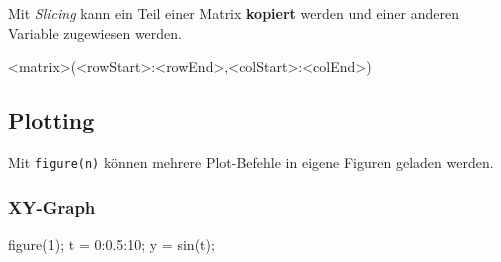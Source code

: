 \documentclass[
  10pt,
  a4paper,
  german]{article}
\newenvironment{Shaded}{}{}
\newcommand{\FloatTok}[1]{\textcolor[rgb]{0.00,0.36,0.77}{#1}}
\newcommand{\NormalTok}[1]{\textcolor[rgb]{0.14,0.16,0.18}{#1}}
\newcommand{\OperatorTok}[1]{\textcolor[rgb]{0.14,0.16,0.18}{#1}}
\newcommand{\VariableTok}[1]{\textcolor[rgb]{0.89,0.38,0.04}{#1}}
\numberwithin{equation}{section}
\begin{document}
\begin{multicols}{2}
\begin{tcolorbox}
Mit \emph{Slicing} kann ein Teil einer Matrix \textbf{kopiert} werden
und einer anderen Variable zugewiesen werden.

\begin{Shaded}
\begin{Highlighting}[]
\OperatorTok{\textless{}}\VariableTok{matrix}\OperatorTok{\textgreater{}}\NormalTok{(}\OperatorTok{\textless{}}\VariableTok{rowStart}\OperatorTok{\textgreater{}:\textless{}}\VariableTok{rowEnd}\OperatorTok{\textgreater{},\textless{}}\VariableTok{colStart}\OperatorTok{\textgreater{}:\textless{}}\VariableTok{colEnd}\OperatorTok{\textgreater{}}\NormalTok{)}
\end{Highlighting}
\end{Shaded}

\end{tcolorbox}

\hypertarget{plotting}{%
\subsection{Plotting}\label{plotting}}

\begin{tcolorbox}[enhanced jigsaw, rightrule=.15mm, toprule=.15mm, leftrule=.75mm, opacityback=0, title=\textcolor{quarto-callout-note-color}{\faInfo}\hspace{0.5em}{Figure-Separierung}, opacitybacktitle=0.6, colback=white, arc=.35mm, bottomrule=.15mm, colframe=quarto-callout-note-color-frame, coltitle=black, bottomtitle=1mm, left=2mm, toptitle=1mm, breakable, titlerule=0mm, colbacktitle=quarto-callout-note-color!10!white]

Mit \texttt{figure(n)} können mehrere Plot-Befehle in eigene Figuren
geladen werden.

\end{tcolorbox}

\hypertarget{xy-graph}{%
\subsubsection{XY-Graph}\label{xy-graph}}

\begin{Shaded}
\begin{Highlighting}[]
\VariableTok{figure}\NormalTok{(}\FloatTok{1}\NormalTok{)}\OperatorTok{;}
\VariableTok{t} \OperatorTok{=} \FloatTok{0}\OperatorTok{:}\FloatTok{0.5}\OperatorTok{:}\FloatTok{10}\OperatorTok{;}
\VariableTok{y} \OperatorTok{=} \VariableTok{sin}\NormalTok{(}\VariableTok{t}\NormalTok{)}\OperatorTok{;}


\end{Highlighting}
\end{Shaded}
\end{multicols}
\end{document}
